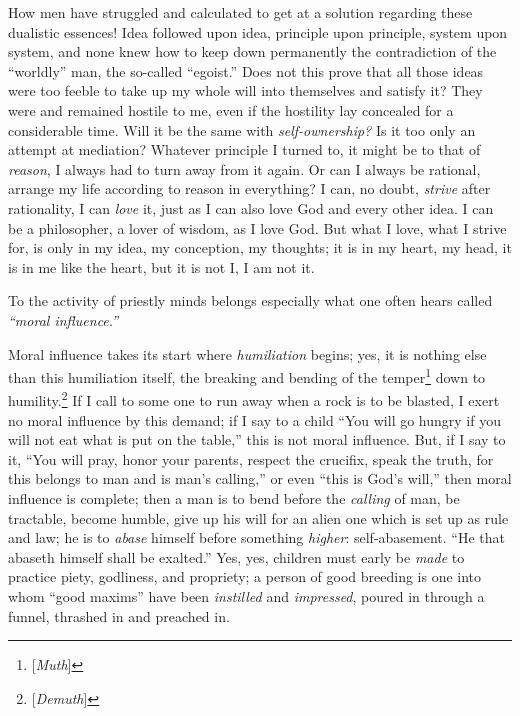 \documentclass[12pt,a4paper]{book}
\begin{document}
How men have struggled and calculated to get at a solution regarding these 
dualistic essences! Idea followed upon idea, principle upon principle, system 
upon system, and none knew how to keep down permanently the contradiction of 
the ``worldly'' man, the so-called ``egoist.'' Does not this prove that 
all those ideas were too feeble to take up my whole will into themselves and 
satisfy it? They were and remained hostile to me, even if the hostility lay 
concealed for a considerable time. Will it be the same with 
\textit{self-ownership?} Is it too only an attempt at mediation? Whatever 
principle I turned to, it might be to that of \textit{reason}, I always had to 
turn away from it again. Or can I always be rational, arrange my life 
according to reason in everything? I can, no doubt, \textit{strive} after 
rationality, I can \textit{love} it, just as I can also love God and every 
other idea. I can be a philosopher, a lover of wisdom, as I love God. But what 
I love, what I strive for, is only in my idea, my conception, my thoughts; it 
is in my heart, my head, it is in me like the heart, but it is not I, I am not 
it.

To the activity of priestly minds belongs especially what one often hears 
called \textit{``moral influence.''}

Moral influence takes its start where \textit{humiliation} begins; yes, it is 
nothing else than this humiliation itself, the breaking and bending of the 
temper\footnote{[\textit{Muth}]} down to humility.\footnote{[\textit{Demuth}]} 
If I call to some one to run away when a rock is to be blasted, I exert no 
moral influence by this demand; if I say to a child ``You will go hungry if 
you will not eat what is put on the table,'' this is not moral influence. 
But, if I say to it, ``You will pray, honor your parents, respect the 
crucifix, speak the truth, for this belongs to man and is man's calling,'' or 
even ``this is God's will,'' then moral influence is complete; then a man is 
to bend before the \textit{calling} of man, be tractable, become humble, give 
up his will for an alien one which is set up as rule and law; he is to 
\textit{abase} himself before something \textit{higher}: self-abasement. ``He 
that abaseth himself shall be exalted.'' Yes, yes, children must early be 
\textit{made} to practice piety, godliness, and propriety; a person of good 
breeding is one into whom ``good maxims'' have been \textit{instilled} and 
\textit{impressed}, poured in through a funnel, thrashed in and preached in.
\end{document}
